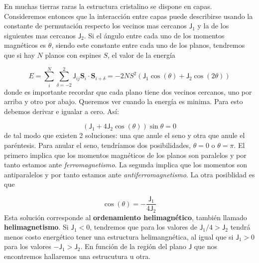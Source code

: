 \documentclass[12pt,a4paper]{book}
\numberwithin{equation}{section}
\numberwithin{figure}{section}
\newcommand{\Jsf}{\mathsf{J}}
\newcommand{\Sn}{\mathbf{S}}
\begin{document}
En muchas tierras raras la estructura cristalino se dispone en capas. Consideremos entonces que la interacción entre capas puede describirse usando la constante de permutación respecto los vecinos mas cercanos $\Jsf_1$ y la de los siguientes mas cercanos $\Jsf_2$. Si el ángulo entre cada uno de los momentos magnéticos es $\theta$, siendo este constante entre cada uno de los planos, tendremos que si hay $N$  planos con espines $S$, el valor de la energía

\begin{equation}
    E =  \sum_i^N \sum_{\delta=-2}^2 \Jsf_{ij} \Sn_{i} \cdot \Sn_{i+\delta} =- 2 N S^2  (\Jsf_1 \cos (\theta) + \Jsf_2 \cos (2 \theta))
\end{equation}
donde es importante recordar que cada plano tiene dos vecinos cercanos, uno por arriba y otro por abajo. Queremos ver cuando la energía es minima. Para esto debemos derivar e igualar a cero. Así:

\begin{equation}
    (\Jsf_1 + 4 \Jsf_2\cos (\theta)) \sin \theta = 0
\end{equation}
de tal modo que existen 2 soluciones: una que anule el seno y otra que anule el paréntesis. Para anular el seno, tendríamos dos posibilidades, $\theta=0$ o $\theta=\pi$. El primero implica que los momentos magnéticos de los planos son paralelos y por tanto estamos ante \textit{ferromagnetismo}. La segunda implica que los momentos son antiparalelos y por tanto estamos ante \textit{antiferromagnetismo}. La otra posiblidad es que

\begin{equation}
    \cos (\theta) = - \frac{\Jsf_1}{4 \Jsf_2}
\end{equation}
Esta solución corresponde al \textbf{ordenamiento helimagnético}, también llamado \textbf{helimagnetismo}. Si $\Jsf_1<0$, tendremos que para los valores de $\Jsf_1/4 > \Jsf_2$ tendrá menos costo energético tener una estructura helimangnética, al igual que si $\Jsf_1>0$ para los valores $-\Jsf_1>\Jsf_2$. En función de la región del plano $\Jsf$ que nos encontremos hallaremos una estrucutura u otra.  


\end{document}
